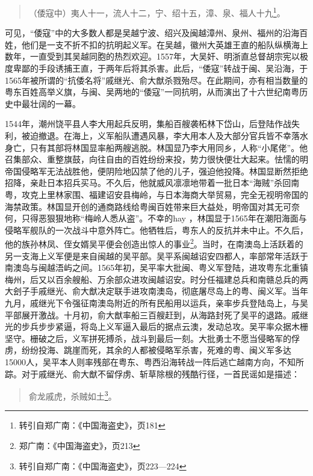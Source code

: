 \begin{quote}

（倭寇中）夷人十一，流人十二，宁、绍十五，漳、泉、福人十九\footnote{转引自郑广南：《中国海盗史》，页181}。

\end{quote}

可见，“倭寇”中的大多数人都是吴越宁波、绍兴及闽越漳州、泉州、福州的沿海百姓，他们是一支不折不扣的抗明起义军。在吴越，徽州大英雄王直的船队纵横海上数年，一直受到其吴越同胞的热烈欢迎。1557年，大吴奸、明浙直总督胡宗宪以极度卑鄙的手段诱捕王直，于两年后将其杀害。此后，“倭寇”转战于闽、吴沿海，于1565年被所谓的“抗倭名将”戚继光、俞大猷杀戮殆尽。在此期间，亦有相当数量的粤东百姓高举义旗，与闽、吴两地的“倭寇”一同抗明，从而演出了十六世纪南粤历史中最壮阔的一幕。

1544年，潮州饶平县人李大用起兵反明，集船百艘袭柘林下岱山，后登陆作战失利，被迫撤退。在海上，义军船队遭遇风暴，李大用本人及大部分官兵皆不幸落水身亡，只有其部将林国显率船两艘逃脱。林国显乃李大用同乡，人称“小尾佬”。他召集部众、重整旗鼓，向往自由的百姓纷纷来投，势力很快便壮大起来。怯懦的明帝国侵略军无法战胜他，便阴险地囚禁了他的儿子，强迫他投降。林国显断然拒绝招降，亲赴日本招兵买马。不久后，他就威风凛凛地带着一批日本“海贼”杀回南粤，攻克上里林家围、福建诏安县梅岭，与日本海商大举贸易，完全无视明帝国的海禁政策。林国显开创的通商路线给粤闽百姓带来巨大益处，明帝国对其无可奈何，只得恶狠狠地称“梅岭人悉从盗”。不幸的hay ，林国显于1565年在潮阳海面与侵略军舰队的一次战斗中意外阵亡。他牺牲后，粤东人的反抗并未中止。不久后，他的族孙林凤、侄女婿吴平便会创造出惊人的事业\footnote{郑广南：《中国海盗史》，页213}。当时，在南澳岛上活跃着的另一支海上义军便是来自闽越的吴平部。吴平系闽越诏安四都人，率部常年活跃于南澳岛与闽越浯屿之间。1565年初，吴平率大批闽、粤义军登陆，进攻粤东北重镇梅州，后又以百余艘船、万余部众进攻闽越诏安。时分任福建总兵和南赣总兵的两大刽子手戚继光、俞大猷决定联手进攻南澳岛，彻底屠尽岛上的粤、闽义军。当年九月，戚继光下令强征南澳岛附近的所有民船用以运兵，亲率步兵登陆岛上，与吴平部展开激战。十月初，俞大猷率船三百艘赶到，从海路封死了吴平的退路。戚继光的步兵步步紧逼，将岛上义军逼入最后的据点云澳，发动总攻。吴平率众据木栅坚守。栅破之后，义军拼死搏杀，战斗到最后一刻。大批勇士不愿当侵略军的俘虏，纷纷投海、跳崖而死，其余的人都被侵略军杀害，死难的粤、闽义军多达15000人，吴平本人则率残部在粤东、粤西沿海转战一阵后逃亡越南方向，不知所踪。对于戚继光、俞大猷不留俘虏、斩草除根的残酷行径，一首民谣如是描述：

\begin{quote}

俞龙戚虎，杀贼如土\footnote{转引自郑广南：《中国海盗史》，页223—224}。

\end{quote}

